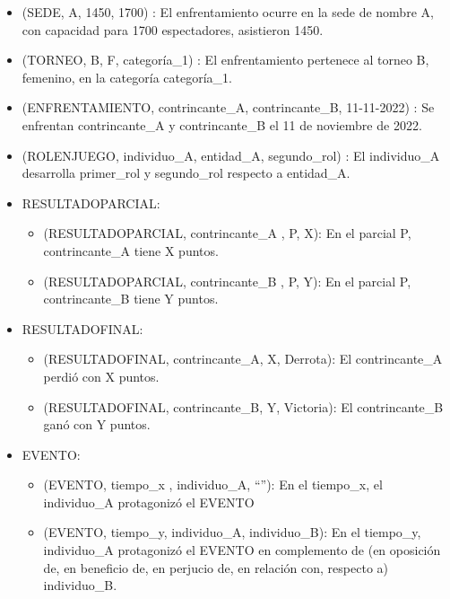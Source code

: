    \begin{itemize}
        \item (SEDE, A, 1450, 1700) : El enfrentamiento ocurre en la sede de nombre A, con capacidad para 1700 espectadores, asistieron 1450.
        \item (TORNEO, B, F, categoría\_1) : El enfrentamiento pertenece al torneo B, femenino, en la categoría categoría\_1.
        \item (ENFRENTAMIENTO, contrincante\_A, contrincante\_B, 11-11-2022) : Se enfrentan contrincante\_A y contrincante\_B el 11 de noviembre de 2022. 
        \item (ROLENJUEGO, individuo\_A, entidad\_A, segundo\_rol) : El individuo\_A desarrolla primer\_rol y segundo\_rol respecto a entidad\_A.
        \item RESULTADOPARCIAL:
            \begin{itemize}
                \item (RESULTADOPARCIAL, contrincante\_A , P, X): En el parcial P, contrincante\_A tiene X puntos.
                \item (RESULTADOPARCIAL, contrincante\_B , P, Y): En el parcial P, contrincante\_B tiene Y puntos.
            \end{itemize}
        \item RESULTADOFINAL:
            \begin{itemize}
                \item (RESULTADOFINAL, contrincante\_A, X, Derrota): El contrincante\_A perdió con X puntos.
                \item (RESULTADOFINAL, contrincante\_B, Y, Victoria): El contrincante\_B ganó con Y puntos.
            \end{itemize}
        \item EVENTO: 
            \begin{itemize}
                \item (EVENTO, tiempo\_x , individuo\_A, “”): En el tiempo\_x, el individuo\_A protagonizó el EVENTO
                \item (EVENTO, tiempo\_y, individuo\_A, individuo\_B): En el tiempo\_y, individuo\_A protagonizó el EVENTO en 
                complemento de (en oposición de, en beneficio de, en perjucio de, en relación con, respecto a) individuo\_B. 
            \end{itemize}
    \end{itemize}

   


